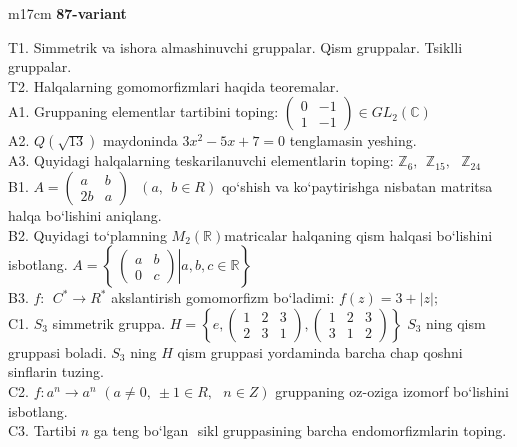 \documentclass{article}
\begin{document}
\begin{tabular}{m{17cm}}
\textbf{87-variant}
\newline

T1. Simmetrik va ishora almashinuvchi gruppalar. Qism gruppalar. Tsiklli gruppalar. \\
T2. Halqalarning gomomorfizmlari haqida teoremalar. \\
A1. Gruppaning elementlar tartibini toping: \(\begin{pmatrix}
0 & - 1 \\
1 & - 1
\end{pmatrix} \in GL_{2}(\mathbb{C})\) \\
A2. \(Q(\sqrt{13})\) maydoninda \(3x^{2} - 5x + 7 = 0\) tenglamasin yeshing. \\
A3. Quyidagi halqalarning teskarilanuvchi elementlarin toping: \(\mathbb{Z}_{6},\ \ \mathbb{Z}_{15},\ \ \ \mathbb{Z}_{24}\) \\
B1. \(A = \begin{pmatrix}
a & b \\
2b & a
\end{pmatrix}\ \ \ (a,\ \ b \in R)\) qo`shish va ko`paytirishga nisbatan matritsa halqa bo`lishini aniqlang. \\
B2. Quyidagi to`plamning \(M_{2}(\mathbb{R})\)matricalar halqaning qism halqasi bo`lishini isbotlang. \(A = \left\{ \left. \ \begin{pmatrix}
a & b \\
0 & c
\end{pmatrix} \right|a,b,c\mathbb{\in R} \right\}\) \\
B3. \(f:\ \ C^{*} \rightarrow R^{*}\) akslantirish gomomorfizm bo`ladimi: \(f(z) = 3 + |z|;\) \\
C1. \(S_{3}\) simmetrik gruppa. \(H = \left\{ e,\begin{pmatrix}
1 & 2 & 3 \\
2 & 3 & 1
\end{pmatrix},\begin{pmatrix}
1 & 2 & 3 \\
3 & 1 & 2
\end{pmatrix} \right\}\) \(S_{3}\) ning qism gruppasi boladi. \(S_{3}\) ning \(H\) qism gruppasi yordaminda barcha chap qo\textquotesingle shni sinflarin tuzing. \\
C2. \(f:a^{n} \rightarrow a^{n}\) \((a \neq 0,\  \pm 1 \in R,\ \ \ n \in Z)\) gruppaning o\textquotesingle z-o\textquotesingle ziga izomorf bo`lishini isbotlang. \\
C3. Tartibi \(n\) ga teng bo`lgan \(< a >\) sikl gruppasining barcha endomorfizmlarin toping. \\

\end{tabular}
\vspace{1cm}
\end{document}
